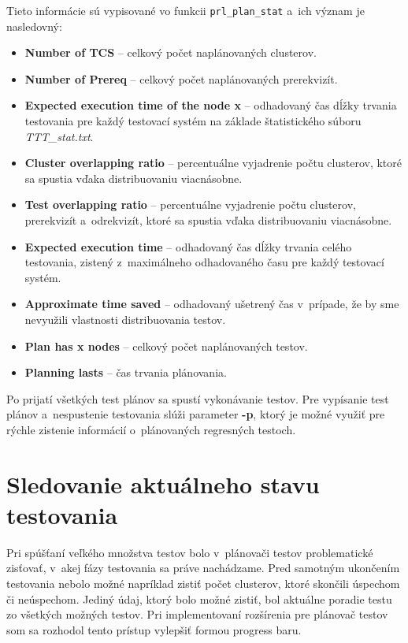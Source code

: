 \noindent Tieto informácie sú vypisované vo funkcii \texttt{prl\_plan\_stat} a~ich význam je nasledovný:
\begin{itemize}
\item \textbf{Number of TCS} -- celkový počet naplánovaných clusterov.
\item \textbf{Number of Prereq} -- celkový počet naplánovaných prerekvizít.
\item \textbf{Expected execution time of the node x} -- odhadovaný čas dĺžky
trvania testovania pre každý testovací systém na 
základe štatistického súboru \textit{TTT\_stat.txt}.
\item \textbf{Cluster overlapping ratio} -- percentuálne vyjadrenie počtu
clusterov, ktoré sa spustia vďaka distribuovaniu viacnásobne. 
\item \textbf{Test overlapping ratio} -- percentuálne vyjadrenie počtu
clusterov, prerekvizít a~odrekvizít, ktoré sa spustia vďaka distribuovaniu viacnásobne.
\item \textbf{Expected execution time} -- odhadovaný čas dĺžky
trvania celého testovania, zistený z~maximálneho odhadovaného času pre
každý testovací systém.
\item \textbf{Approximate time saved} -- odhadovaný ušetrený čas v~prípade,
že by sme nevyužili vlastnosti distribuovania testov.
\item \textbf{Plan has x nodes} -- celkový počet naplánovaných testov.
\item \textbf{Planning lasts} -- čas trvania plánovania.
\end{itemize}

Po prijatí všetkých test plánov sa spustí vykonávanie testov. 
Pre vypísanie test plánov a~nespustenie testovania slúži parameter \textbf{-p}, ktorý
je možné využiť pre rýchle zistenie informácií o~plánovaných regresných testoch.


\section{Sledovanie aktuálneho stavu testovania}
\label{sekcia:sledovanie_stavu}
Pri spúšťaní veľkého množstva testov bolo v~plánovači testov problematické
zisťovať, v~akej fázy testovania sa práve nachádzame. Pred samotným ukončením
testovania nebolo možné napríklad zistiť počet clusterov, ktoré skončili úspechom
či neúspechom. Jediný údaj, ktorý bolo možné zistiť, bol aktuálne poradie testu
zo všetkých možných testov.
Pri implementovaní rozšírenia pre plánovač testov som sa rozhodol tento
prístup vylepšiť formou progress baru.

